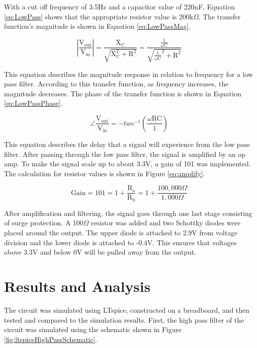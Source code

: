 \documentclass[CMPE]{KGCOEReport}
\begin{document}
With a cut off frequency of 3.5Hz and a capacitor value of 220nF, Equation \ref{eq:LowPass} shows that the appropriate resistor value is 200k$\Omega$. The transfer function's magnitude is shown in Equation \ref{eq:LowPassMag}.

\begin{equation}
|\frac{\text{V}_\text{out}}{\text{V}_\text{in}}| = \frac{\text{X}_\text{C}}{\sqrt{\text{X}_\text{C}^2 + \text{R}^2}} = \frac{\frac{1}{\omega\text{C}}}{\sqrt{\frac{1}{\omega\text{C}}^2 + \text{R}^2}} \label{eq:LowPassMag}
\end{equation}

This equation describes the magnitude response in relation to frequency for a low pass filter. According to this transfer function, as frequency increases, the magnitude decreases. The phase of the transfer function is shown in Equation \ref{eq:LowPassPhase}.

\begin{equation}
\angle\frac{\text{V}_\text{out}}{\text{V}_\text{in}} = -tan^{-1}(\frac{\omega\text{R}\text{C}}{1}) \label{eq:LowPassPhase}
\end{equation}

This equation describes the delay that a signal will experience from the low pass filter. After passing through the low pass filter, the signal is amplified by an op amp. To make the signal scale up to about 3.3V, a gain of 101 was implemented. The calculation for resistor values is shown in Figure \ref{eq:amplify}.

\begin{equation}
\text{Gain} = 101 = 1 + \frac{\text{R}_\text{a}}{\text{R}_\text{b}} = 1 + \frac{100,000\Omega}{1,000\Omega} \label{eq:amplify}
\end{equation}

After amplification and filtering, the signal goes through one last stage consisting of surge protection. A 100$\Omega$ resistor was added and two Schottky diodes were placed around the output. The upper diode is attached to 2.9V from voltage division and the lower diode is attached to -0.4V. This ensures that voltages above 3.3V and below 0V will be pulled away from the output.

\section*{Results and Analysis}

The circuit was simulated using LTspice, constructed on a breadboard, and then tested and compared to the simulation results. First, the high pass filter of the circuit was simulated using the schematic shown in Figure \ref{fig:ltspiceHighPassSchematic}.
\end{document}
